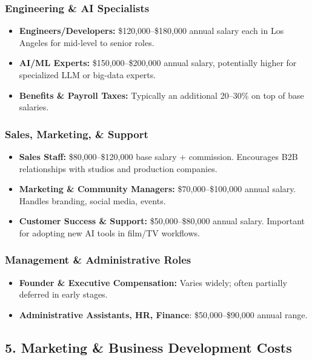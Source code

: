 \documentclass[11pt]{article}
\begin{document}
\subsubsection{Engineering \& AI Specialists}
\begin{itemize}
    \item \textbf{Engineers/Developers:} \$120,000--\$180,000 annual salary each in Los Angeles for mid-level to senior roles.
    \item \textbf{AI/ML Experts:} \$150,000--\$200,000 annual salary, potentially higher for specialized LLM or big-data experts.
    \item \textbf{Benefits \& Payroll Taxes:} Typically an additional 20--30\% on top of base salaries.
\end{itemize}

\subsubsection{Sales, Marketing, \& Support}
\begin{itemize}
    \item \textbf{Sales Staff:} \$80,000--\$120,000 base salary + commission. Encourages B2B relationships with studios and production companies.
    \item \textbf{Marketing \& Community Managers:} \$70,000--\$100,000 annual salary. Handles branding, social media, events.
    \item \textbf{Customer Success \& Support:} \$50,000--\$80,000 annual salary. Important for adopting new AI tools in film/TV workflows.
\end{itemize}

\subsubsection{Management \& Administrative Roles}
\begin{itemize}
    \item \textbf{Founder \& Executive Compensation:} Varies widely; often partially deferred in early stages.
    \item \textbf{Administrative Assistants, HR, Finance}: \$50,000--\$90,000 annual range.
\end{itemize}

\subsection{5. Marketing \& Business Development Costs}
\end{document}
